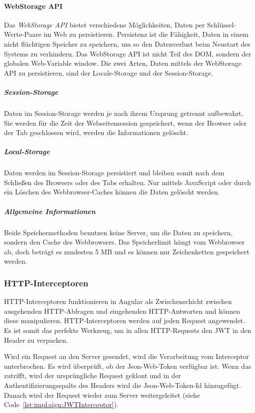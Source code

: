 \paragraph{WebStorage API}
\label{par:impl:usermanagment:WebStorage}
Das \emph{WebStorage API} bietet verschiedene Möglichkeiten, Daten per Schlüssel-Werte-Paare im Web zu persistieren. Persistenz ist die Fähigkeit, Daten in einem nicht flüchtigen Speicher zu speichern, um so den Datenverlust beim Neustart des Systems zu verhindern. Das WebStorage API ist nicht Teil des DOM, sondern der globalen Web-Variable window. Die zwei Arten, Daten mittels der WebStorage API zu persistieren, sind der Locale-Storage und der Session-Storage.
\cite{WikiPersistenzDefinition} \cite{WebStorageAPI}


\subparagraph{Session-Storage}
Daten im Session-Storage werden je nach ihrem Ursprung getrennt aufbewahrt. Sie werden für die Zeit der Webseitensession gespeichert, wenn der Browser oder der Tab geschlossen wird, werden die Informationen gelöscht.
\cite{WebStorageAPI}

\subparagraph{Local-Storage}
Daten werden im Session-Storage persistiert und bleiben somit nach dem Schließen des Browsers oder des Tabs erhalten. Nur mittels JavaScript oder durch ein Löschen des Webbrowser-Caches können die Daten gelöscht werden.
\cite{WebStorageAPI}

\subparagraph{Allgemeine Informationen}
Beide Speichermethoden benutzen keine Server, um die Daten zu speichern, sondern den Cache des Webbrowsers. Das Speicherlimit hängt vom Webbrowser ab, doch beträgt es mndesten 5 MB und es können nur Zeichenketten gespeichert werden.
\cite{WebStorageAPI}

\subsubsection{HTTP-Interceptoren}
\label{sec:httpinterceptor}
HTTP-Interceptoren funktionieren in Angular als Zwischenschicht zwischen ausgehenden HTTP-Abfragen und eingehenden HTTP-Antworten und können diese manipulieren.
 HTTP-Interceptoren werden auf jeden Request angewendet. Es ist somit das perfekte Werkzeug, um in allen HTTP-Requests den JWT in den Header zu verpacken.
\cite[10.3 Interceptoren: HTTP-Requests abfangen und transformieren]{AngularBuch}

Wird ein Request an den Server gesendet, wird die Verarbeitung vom Interceptor unterbrochen. Es wird überprüft, ob der Json-Web-Token verfügbar ist. Wenn das zutrifft, wird der ursprüngliche Request geklont und in der Authentifizierungsspalte des Headers wird die Json-Web-Token-Id hinzugefügt. Danach wird der Request wieder zum Server weitergeleitet (siehe Code \ref{lst:impl:sign:JWTInterceptor}). 

